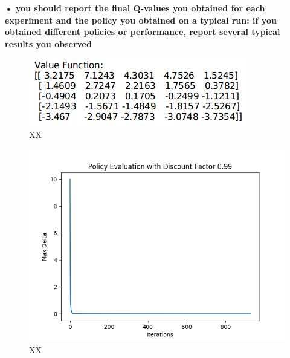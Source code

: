 \documentclass[11pt]{article}
\begin{document}
\noindent
\textbf{• you should report the final Q-values you obtained for each experiment and the policy
you obtained on a typical run: if you obtained different policies or performance,
report several typical results you observed}

\begin{figure}[h]
\includegraphics[scale=0.6]{v_evaluation}
\centering
\caption{XX}
\end{figure}

\begin{figure}[h]
\includegraphics[scale=0.7]{policy_evaluation_99}
\centering
\caption{XX}
\end{figure}

\newpage
\end{document}

